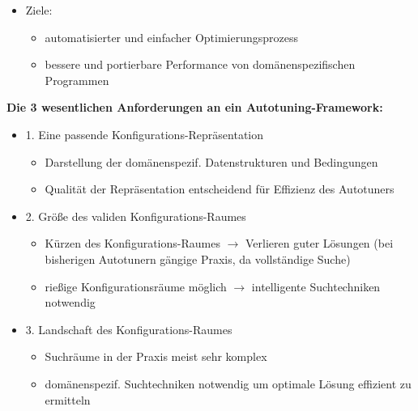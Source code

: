     \begin{frame}

    \begin{itemize}
      \item Ziele:
      \begin{itemize}
        \item automatisierter und einfacher Optimierungsprozess
        \item bessere und portierbare Performance von domänenspezifischen Programmen
      \end{itemize}
    \end{itemize}
    
    \textbf{Die 3 wesentlichen Anforderungen an ein Autotuning-Framework:}
    
    \begin{itemize}
       
    \item 1. Eine passende Konfigurations-Repräsentation
        \begin{itemize}
          \item Darstellung der domänenspezif. Datenstrukturen und Bedingungen
          \item Qualität der Repräsentation entscheidend für Effizienz des Autotuners \newline
        \end{itemize}
        
    \item 2. Größe des validen Konfigurations-Raumes
        \begin{itemize}
          \item Kürzen des Konfigurations-Raumes $\rightarrow$ Verlieren guter Lösungen
          (bei bisherigen Autotunern gängige Praxis, da vollständige Suche)
          \item rießige Konfigurationsräume möglich $\rightarrow$  intelligente Suchtechniken notwendig \newline
        \end{itemize}
        
    \item 3. Landschaft des Konfigurations-Raumes
      \begin{itemize}
        \item Suchräume in der Praxis meist sehr komplex 
        \item domänenspezif. Suchtechniken notwendig um optimale Lösung effizient zu ermitteln
      \end{itemize}
    \end{itemize}
        
    \end{frame}
    
